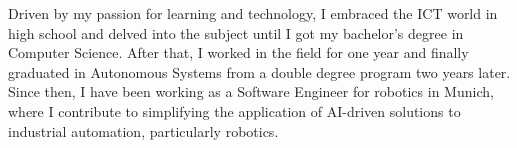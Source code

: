 \documentclass[11 pt,oneside,a4paper,titlepage]{article}
\begin{document}
{\begin{minipage}{7.3cm}
        Driven by my passion for learning and technology, I embraced the ICT world in high school and delved into the subject until I got my bachelor's degree in Computer Science. After that, I worked in the field for one year and finally graduated in Autonomous Systems from a double degree program two years later. Since then, I have been working as a Software Engineer for robotics in Munich, where I contribute to simplifying the application of AI-driven solutions to industrial automation, particularly robotics.
        \vspace*{0.18cm}


\end{minipage}}
\end{document}
